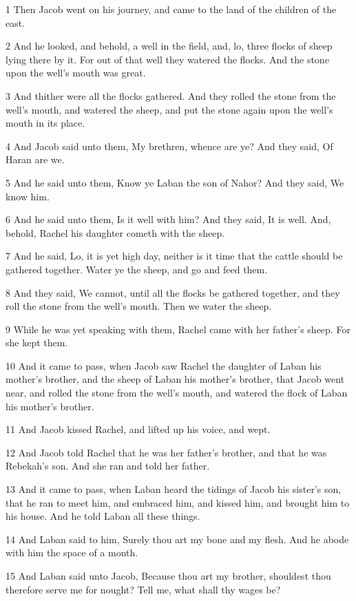 \par 1 Then Jacob went on his journey, and came to the land of the children of the east.
\par 2 And he looked, and behold, a well in the field, and, lo, three flocks of sheep lying there by it. For out of that well they watered the flocks. And the stone upon the well's mouth was great.
\par 3 And thither were all the flocks gathered. And they rolled the stone from the well's mouth, and watered the sheep, and put the stone again upon the well's mouth in its place.
\par 4 And Jacob said unto them, My brethren, whence are ye? And they said, Of Haran are we.
\par 5 And he said unto them, Know ye Laban the son of Nahor? And they said, We know him.
\par 6 And he said unto them, Is it well with him? And they said, It is well. And, behold, Rachel his daughter cometh with the sheep.
\par 7 And he said, Lo, it is yet high day, neither is it time that the cattle should be gathered together. Water ye the sheep, and go and feed them.
\par 8 And they said, We cannot, until all the flocks be gathered together, and they roll the stone from the well's mouth. Then we water the sheep.
\par 9 While he was yet speaking with them, Rachel came with her father's sheep. For she kept them.
\par 10 And it came to pass, when Jacob saw Rachel the daughter of Laban his mother's brother, and the sheep of Laban his mother's brother, that Jacob went near, and rolled the stone from the well's mouth, and watered the flock of Laban his mother's brother.
\par 11 And Jacob kissed Rachel, and lifted up his voice, and wept.
\par 12 And Jacob told Rachel that he was her father's brother, and that he was Rebekah's son. And she ran and told her father.
\par 13 And it came to pass, when Laban heard the tidings of Jacob his sister's son, that he ran to meet him, and embraced him, and kissed him, and brought him to his house. And he told Laban all these things.
\par 14 And Laban said to him, Surely thou art my bone and my flesh. And he abode with him the space of a month.
\par 15 And Laban said unto Jacob, Because thou art my brother, shouldest thou therefore serve me for nought? Tell me, what shall thy wages be?
